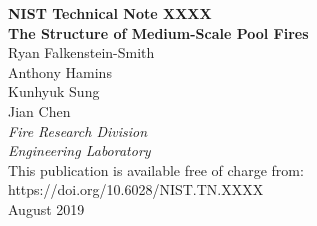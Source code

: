\documentclass[12pt]{article}
\newcommand{\pubnumber}{XXXX}
\newcommand{\DOI}{https://doi.org/10.6028/NIST.TN.XXXX}
\newcommand{\monthyear}{August 2019}
\begin{document}
\begin{titlepage}
\begin{flushright}
\LARGE{\textbf{NIST Technical Note \pubnumber}}\\
\vfill 
\Huge{\textbf{The Structure of Medium-Scale Pool Fires}}\\
\vfill
\normalsize Ryan Falkenstein-Smith\\
Anthony Hamins\\
Kunhyuk Sung\\
Jian Chen\\
\large
\textit{Fire Research Division}\\
\textit{Engineering Laboratory}\\
\vspace{12pt}
\vfill
\normalsize This publication is available free of charge from:\\
\DOI\\
\vfill
\normalsize \monthyear
\vfill


\end{flushright}
\end{titlepage}
\end{document}
